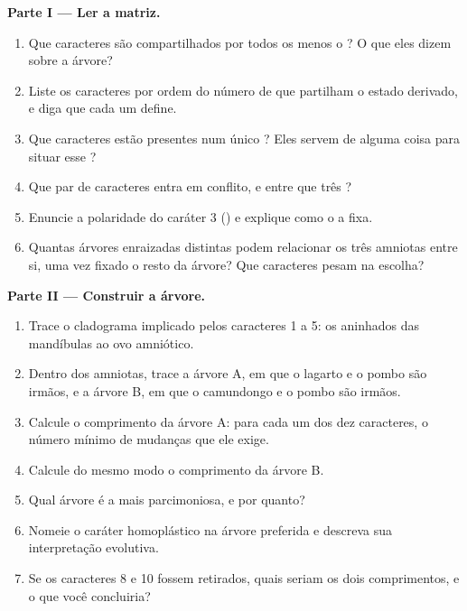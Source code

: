 \begin{problem}
\medskip
\noindent\textbf{Parte I --- Ler a matriz.}
\begin{enumerate}
  \item Que caracteres são compartilhados por todos os  menos o
        ? O que eles dizem sobre a árvore?
  \item Liste os caracteres por ordem do número de  que
        partilham o estado derivado, e diga que  cada um define.
  \item Que caracteres estão presentes num único ? Eles servem de
        alguma coisa para situar esse ?
  \item Que par de caracteres entra em conflito, e entre que três
        ?
  \item Enuncie a polaridade do caráter 3 () e explique como o
         a fixa.
  \item Quantas árvores enraizadas distintas podem relacionar os três
        amniotas entre si, uma vez fixado o resto da árvore? Que
        caracteres pesam na escolha?
\end{enumerate}

\medskip
\noindent\textbf{Parte II --- Construir a árvore.}
\begin{enumerate}[resume]
  \item Trace o cladograma implicado pelos caracteres 1 a 5: os 
        aninhados das mandíbulas ao ovo amniótico.
  \item Dentro dos amniotas, trace a árvore A, em que o lagarto e o
        pombo são  irmãos, e a árvore B, em que o camundongo e o
        pombo são irmãos.
  \item Calcule o comprimento da árvore A: para cada um dos dez
        caracteres, o número mínimo de mudanças que ele exige.
  \item Calcule do mesmo modo o comprimento da árvore B.
  \item Qual árvore é a mais parcimoniosa, e por quanto?
  \item Nomeie o caráter homoplástico na árvore preferida e descreva
        sua interpretação evolutiva.
  \item Se os caracteres 8 e 10 fossem retirados, quais seriam os dois
        comprimentos, e o que você concluiria?
\end{enumerate}


\end{problem}
